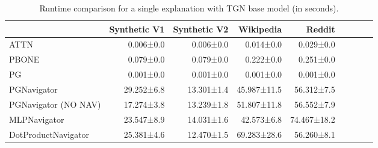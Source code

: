 \begin{table}
\caption{Runtime comparison for a single explanation with TGN base model (in seconds).}
\label{tab:tgn_runtime_single}
\begin{tabular}{lrrrrrrrr}
\toprule
 & Synthetic V1 & Synthetic V2 & Wikipedia & Reddit \\
\midrule
ATTN & 0.006±0.0 & 0.006±0.0 & 0.014±0.0 & 0.029±0.0 \\
PBONE & 0.079±0.0 & 0.079±0.0 & 0.222±0.0 & 0.251±0.0 \\
PG & 0.001±0.0 & 0.001±0.0 & 0.001±0.0 & 0.001±0.0 \\
PGNavigator & 29.252±6.8 & 13.301±1.4 & 45.987±11.5 & 56.312±7.5 \\
PGNavigator (NO NAV) & 17.274±3.8 & 13.239±1.8 & 51.807±11.8 & 56.552±7.9 \\
MLPNavigator & 23.547±8.9 & 14.031±1.6 & 42.573±6.8 & 74.467±18.2 \\
DotProductNavigator & 25.381±4.6 & 12.470±1.5 & 69.283±28.6 & 56.260±8.1 \\
\bottomrule
\end{tabular}
\end{table}
